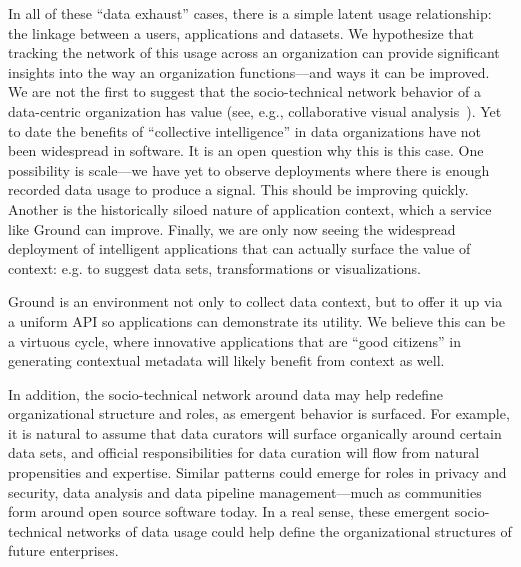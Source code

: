 \documentclass{cidr-2017}
\begin{document}
In all of these ``data exhaust'' cases, there is a simple latent usage relationship: the linkage between a users, applications and datasets. We hypothesize that tracking the network of this usage across an organization can provide significant insights into the way an organization functions---and ways it can be improved. We are not the first to suggest that the socio-technical network behavior of a data-centric organization has value (see, e.g., collaborative visual analysis~\cite{manyeyes,willett}). Yet to date the benefits of ``collective intelligence'' in data organizations have not been widespread in software. It is an open question why this is this case. One possibility is scale---we have yet to observe deployments where there is enough recorded data usage to produce a signal. This should be improving quickly. Another is the historically siloed nature of application context, which a service like Ground can improve. Finally, we are only now seeing the widespread deployment of intelligent applications that can actually surface the value of context: e.g. to suggest data sets, transformations or visualizations.

Ground is an environment not only to collect data context, but to offer it up via a uniform API so applications can demonstrate its utility. We believe this can be a virtuous cycle, where innovative applications that are ``good citizens'' in generating contextual metadata will likely benefit from context as well. 

In addition, the socio-technical network around data may help redefine organizational structure and roles, as emergent behavior is surfaced. For example, it is natural to assume that data curators will surface organically around certain data sets, and official responsibilities for data curation will flow from natural propensities and expertise. Similar patterns could emerge for roles in privacy and security, data analysis and data pipeline management---much as communities form around open source software today. In a real sense, these emergent socio-technical networks of data usage could help define the organizational structures of future enterprises.
\end{document}
